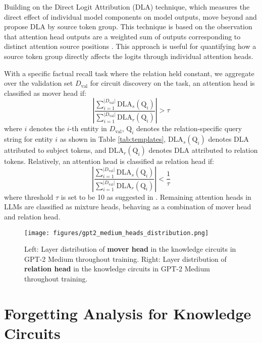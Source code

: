 Building on the Direct Logit Attribution (DLA) technique, which measures the direct effect of individual model components on model outputs, \citet{additive_mechanisms} move beyond and propose DLA by source token group.
This technique is based on the observation that attention head outputs are a weighted sum of outputs corresponding to distinct attention source positions \citep{transformer_circuits}.
This approach is useful for quantifying how a source token group directly affects the logits through individual attention heads.

With a specific factual recall task where the relation held constant, we aggregate over the validation set $D_{\text{val}}$ for circuit discovery on the task, an attention head is classified as mover head if:
\begin{equation}
   \left|\frac{\sum_{i=1}^{|D_{\text{val}}|}\text{DLA}_s(\text{Q}_i)}{\sum_{i=1}^{|D_{\text{val}}|}\text{DLA}_r(\text{Q}_i)}\right| > \tau
\end{equation}
where $i$ denotes the $i$-th entity in $D_{\text{val}}$, $\text{Q}_i$ denotes the relation-specific query string for entity $i$ as shown in Table \ref{tab:templates}, $\text{DLA}_s(\text{Q}_i)$ denotes DLA attributed to subject tokens, and $\text{DLA}_r(\text{Q}_i)$ denotes DLA attributed to relation tokens.
Relatively, an attention head is classified as relation head if:
\begin{equation}
    \left|\frac{\sum_{i=1}^{|D_{\text{val}}|}\text{DLA}_s(\text{Q}_i)}{\sum_{i=1}^{|D_{\text{val}}|}\text{DLA}_r(\text{Q}_i)}\right| < \frac{1}{\tau}
\end{equation}
where threshold $\tau$ is set to be 10 as suggested in \citet{additive_mechanisms}.
Remaining attention heads in LLMs are classified as mixture heads, behaving as a combination of mover head and relation head.

\begin{figure}
    \centering
    \texttt{[image: figures/gpt2\_medium\_heads\_distribution.png]}
    \caption{Left: Layer distribution of \textbf{mover head} in the knowledge circuits in GPT-2 Medium throughout training. Right: Layer distribution of \textbf{relation head} in the knowledge circuits in GPT-2 Medium throughout training.}
    \label{fig:gpt2_medium_heads_distribution}
    \vspace{-15pt}
\end{figure}

\section{Forgetting Analysis for Knowledge Circuits}

